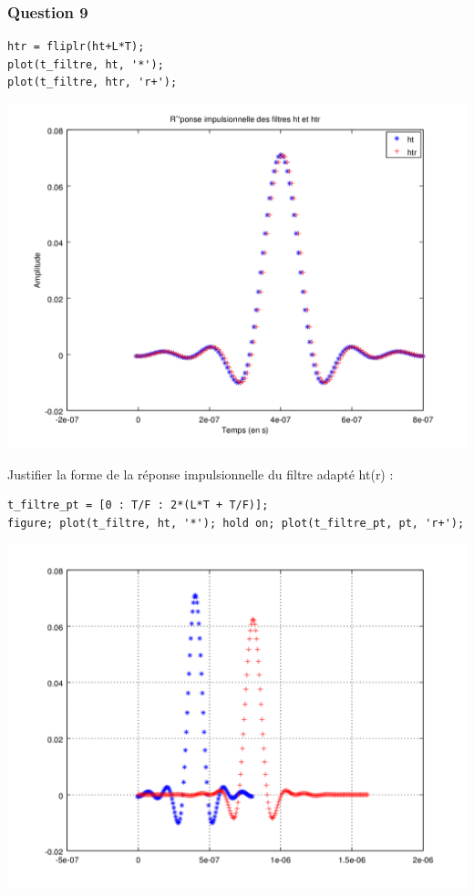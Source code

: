 \documentclass{acm_proc_article-sp}
\begin{document}
\subsubsection{Question 9}

\begin{lstlisting}
htr = fliplr(ht+L*T);
plot(t_filtre, ht, '*');
plot(t_filtre, htr, 'r+');
\end{lstlisting}

\begin{center}
\includegraphics[scale=0.45]{ht_htr_9.png}
\end{center}

Justifier la forme de la réponse impulsionnelle du filtre adapté ht(r) :

\begin{lstlisting}
t_filtre_pt = [0 : T/F : 2*(L*T + T/F)];
figure; plot(t_filtre, ht, '*'); hold on; plot(t_filtre_pt, pt, 'r+');
\end{lstlisting}

\begin{center}
\includegraphics[scale=0.45]{ht_pt_9.png}
\end{center}
\end{document}
